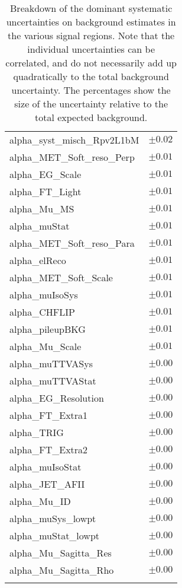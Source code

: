 \begin{table}
\begin{center}
\begin{tabular*}{\textwidth}{@{\extracolsep{\fill}}lc}
alpha\_syst\_misch\_Rpv2L1bM         & $\pm 0.02$       \\
alpha\_MET\_Soft\_reso\_Perp         & $\pm 0.01$       \\
alpha\_EG\_Scale         & $\pm 0.01$       \\
alpha\_FT\_Light         & $\pm 0.01$       \\
alpha\_Mu\_MS         & $\pm 0.01$       \\
alpha\_muStat         & $\pm 0.01$       \\
alpha\_MET\_Soft\_reso\_Para         & $\pm 0.01$       \\
alpha\_elReco         & $\pm 0.01$       \\
alpha\_MET\_Soft\_Scale         & $\pm 0.01$       \\
alpha\_muIsoSys         & $\pm 0.01$       \\
alpha\_CHFLIP         & $\pm 0.01$       \\
alpha\_pileupBKG         & $\pm 0.01$       \\
alpha\_Mu\_Scale         & $\pm 0.01$       \\
alpha\_muTTVASys         & $\pm 0.00$       \\
alpha\_muTTVAStat         & $\pm 0.00$       \\
alpha\_EG\_Resolution         & $\pm 0.00$       \\
alpha\_FT\_Extra1         & $\pm 0.00$       \\
alpha\_TRIG         & $\pm 0.00$       \\
alpha\_FT\_Extra2         & $\pm 0.00$       \\
alpha\_muIsoStat         & $\pm 0.00$       \\
alpha\_JET\_AFII         & $\pm 0.00$       \\
alpha\_Mu\_ID         & $\pm 0.00$       \\
alpha\_muSys\_lowpt         & $\pm 0.00$       \\
alpha\_muStat\_lowpt         & $\pm 0.00$       \\
alpha\_Mu\_Sagitta\_Res         & $\pm 0.00$       \\
alpha\_Mu\_Sagitta\_Rho         & $\pm 0.00$       \\
\noalign{\smallskip}\hline\noalign{\smallskip}
\end{tabular*}
\end{center}
\caption[Breakdown of uncertainty on background estimates]{
Breakdown of the dominant systematic uncertainties on background estimates in the various signal regions.
Note that the individual uncertainties can be correlated, and do not necessarily add up quadratically to 
the total background uncertainty. The percentages show the size of the uncertainty relative to the total expected background.
\label{table.results.bkgestimate.uncertainties.Rpv2L1bM}}
\end{table}
\clearpage
%